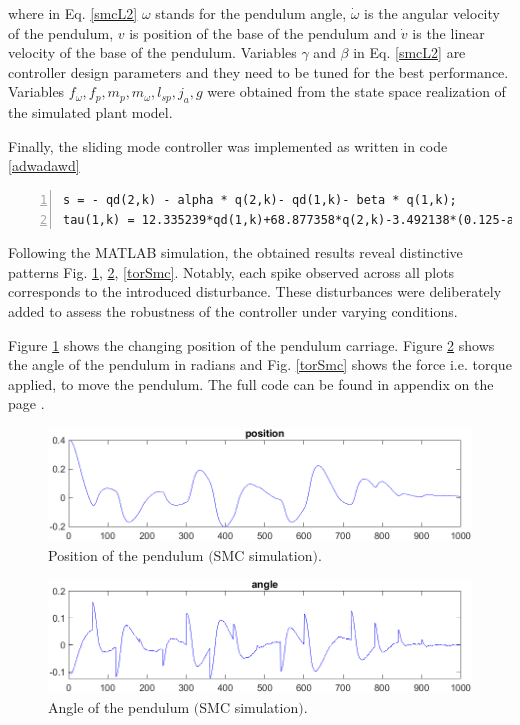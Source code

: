where in Eq. \ref{smcL2} $\omega$ stands for the pendulum angle, $\dot{\omega}$ is the angular velocity of the pendulum, $v$ is position of the base of the pendulum and $\dot{v}$ is the linear velocity of the base of the pendulum. Variables $\gamma$ and $\beta$ in Eq. \ref{smcL2} are controller design parameters and they need to be tuned for the best performance. Variables $f_\omega, f_p, m_p, m_\omega, l_{sp}, j_a, g$ were obtained from the state space realization of the simulated plant model. 

Finally, the sliding mode controller was implemented as written in code \ref{adwadawd}

\begin{lstlisting}[numbers=left,label=adwadawd,caption={Sliding mode control implementation in MATLAB.},captionpos=b]
s = - qd(2,k) - alpha * q(2,k)- qd(1,k)- beta * q(1,k); 
tau(1,k) = 12.335239*qd(1,k)+68.877358*q(2,k)-3.492138*(0.125-alpha)*qd(2,k)-3.492138*(1.7568-beta)*qd(1,k)-(var_k * sign(s));
\end{lstlisting}

Following the MATLAB simulation, the obtained results reveal distinctive patterns Fig. \ref{posSmc}, \ref{angSmc}, \ref{torSmc}. Notably, each spike observed across all plots corresponds to the introduced disturbance. These disturbances were deliberately added to assess the robustness of the controller under varying conditions.

Figure \ref{posSmc} shows the changing position of the pendulum carriage. Figure \ref{angSmc} shows the angle of the pendulum in radians and Fig. \ref{torSmc} shows the force i.e. torque applied, to move the pendulum. The full code can be found in appendix on the page \pageref{smcSim}.

\begin{figure}[!tbh]
	\centering
	\includegraphics[width=150mm]{obr/posSmc.png}
	\caption{Position of the pendulum $($SMC simulation$)$.}\label{posSmc}
\end{figure}

\begin{figure}[!tbh]
	\centering
	\includegraphics[width=150mm]{obr/angSmc.png}
	\caption{Angle of the pendulum $($SMC simulation$)$.}\label{angSmc}
\end{figure}

